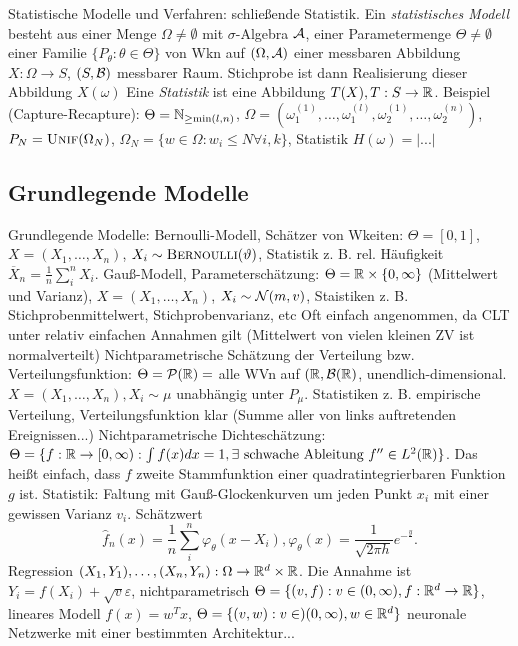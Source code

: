 \begin{outline}
    \1 Statistische Modelle und Verfahren: schließende Statistik.
        \2 Ein \emph{statistisches Modell} besteht aus 
            \3 einer Menge $\Omega \neq \emptyset$ mit $\sigma$-Algebra $\cA$,
            \3 einer Parametermenge $\Theta \neq \emptyset$
            \3 einer Familie $\{P_\theta : \theta \in \Theta\}$ von Wkn auf $(\Omega,\cA)$
            \3 einer messbaren Abbildung $X:\Omega\rightarrow S$, $(S,\cB)$ messbarer Raum. Stichprobe ist dann Realisierung dieser Abbildung $X(\omega)$
        \2 Eine \emph{Statistik} ist eine Abbildung $T(X), T:S\rightarrow \R$.
        \2 Beispiel (Capture-Recapture): 
            \3 $\Theta = \N_{\geq \min (l,n)}$, 
            \3 $\Omega = {(\omega_1^{(1)},\ldots,\omega_1^{(l)}, \omega_2^{(1)},\ldots,\omega_2^{(n)})}$, $P_N = \textsc{Unif}(\Omega_N)$, $\Omega_N = \{w\in\Omega : w_i \leq N \forall i, k\}$, 
            \3 Statistik $H(\omega)=|...|$
\end{outline}

\subsection{Grundlegende Modelle}

\begin{outline}
    \1 Grundlegende Modelle:
        \2 Bernoulli-Modell, Schätzer von Wkeiten: $\Theta=[0,1]$, $X=(X_1,\ldots,X_n)$, $X_i \sim \textsc{Bernoulli}(\theta)$, Statistik z. B. rel. Häufigkeit $\overline{X}_n = \frac{1}{n}\sum_i^n X_i$.
        \2 Gauß-Modell, Parameterschätzung: $\Theta = \R\times\{0,\infty\}$ (Mittelwert und Varianz), $X=(X_1,\ldots,X_n)$, $X_i \sim \cN(m,v)$, Staistiken z. B. Stichprobenmittelwert, Stichprobenvarianz, etc
            \3 Oft einfach angenommen, da CLT unter relativ einfachen Annahmen gilt (Mittelwert von vielen kleinen ZV ist normalverteilt)
        \2 Nichtparametrische Schätzung der Verteilung bzw. Verteilungsfunktion: $\Theta = \cP(\R) =$ alle WVn auf $(\R,\cB(\R)$, unendlich-dimensional. $X=(X_1,\ldots,X_n), X_i\sim \mu$ unabhängig unter $P_\mu$. Statistiken z. B. empirische Verteilung, Verteilungsfunktion klar (Summe aller von links auftretenden Ereignissen...)
        \2 Nichtparametrische Dichteschätzung: $\Theta =\{f:\R \rightarrow [0, \infty) : \int f(x) dx = 1, \exists \text{ schwache Ableitung } f''\in L^2(\R) \}$. Das heißt einfach, dass $f$ zweite Stammfunktion einer quadratintegrierbaren Funktion $g$ ist. Statistik: Faltung mit Gauß-Glockenkurven um jeden Punkt $x_i$ mit einer gewissen Varianz $v_i$. Schätzwert $$\hat{f}_n(x)=\frac{1}{n} \sum^n_i \varphi_\theta (x-X_i), \varphi_\theta (x)=\frac{1}{\sqrt{2\pi h}}e^{-\frac{y}{}}.$$
        \2 Regression $(X_1,Y_1),\ldots,(X_n,Y_n): \Omega \rightarrow \R^d \times \R$. Die Annahme ist $Y_i = f(X_i) + \sqrt{v}\varepsilon$, nichtparametrisch $\Theta = \{(v,f) : v\in(0,\infty), f:\R^d\rightarrow \R\}$, lineares Modell $f(x)=w^Tx$, $\Theta= \{(v,w):v\in)(0,\infty), w\in \R^d\}$
        \2 neuronale Netzwerke mit einer bestimmten Architektur... 
\end{outline}

